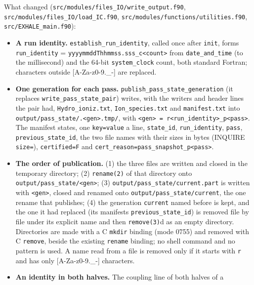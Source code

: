 \documentclass[english,a4paper]{my_memo}
\providecommand{\tightlist}{\setlength{\itemsep}{0pt}\setlength{\parskip}{0pt}}
\begin{document}
What changed (\texttt{src/modules/files\_IO/write\_output.f90},
\texttt{src/modules/files\_IO/load\_IC.f90}, \texttt{src/modules/functions/utilities.f90},
\texttt{src/EXHALE\_main.f90}):

\begin{itemize}
\tightlist
\item
  \textbf{A run identity.} \texttt{establish\_run\_identity}, called once after \texttt{init},
  forms \texttt{run\_identity} = \texttt{yyyymmddThhmmss.sss\_c\textless{}count\textgreater{}} from
  \texttt{date\_and\_time} (to the millisecond) and the 64-bit \texttt{system\_clock} count,
  both standard Fortran; characters outside {[}A-Za-z0-9.\_-{]} are replaced.
\item
  \textbf{One generation for each pass.} \texttt{publish\_pass\_state\_generation}
  (it replaces \texttt{write\_pass\_state\_pair}) writes, with the writers and header
  lines the pair had, \texttt{Hydro\_ioniz.txt}, \texttt{Ion\_species.txt} and
  \texttt{manifest.txt} into \texttt{output/pass\_state/.\textless{}gen\textgreater{}.tmp/}, with
  \texttt{\textless{}gen\textgreater{}\ =\ r\textless{}run\_identity\textgreater{}\_p\textless{}pass\textgreater{}}. The manifest states, one \texttt{key=value} a
  line, \texttt{state\_id}, \texttt{run\_identity}, \texttt{pass}, \texttt{previous\_state\_id}, the two file
  names with their sizes in bytes (INQUIRE \texttt{size=}), \texttt{certified=F} and
  \texttt{cert\_reason=pass\_snapshot\_p\textless{}pass\textgreater{}}.
\item
  \textbf{The order of publication.} (1) the three files are written and closed
  in the temporary directory; (2) \texttt{rename(2)} of that directory onto
  \texttt{output/pass\_state/\textless{}gen\textgreater{}}; (3) \texttt{output/pass\_state/current.part} is written
  with \texttt{\textless{}gen\textgreater{}}, closed and renamed onto \texttt{output/pass\_state/current}, the one
  rename that publishes; (4) the generation \texttt{current} named before is kept,
  and the one it had replaced (its manifest\textquotesingle s \texttt{previous\_state\_id}) is removed
  file by file under its explicit name and then \texttt{remove(3)}d as an empty
  directory. Directories are made with a C \texttt{mkdir} binding (mode 0755) and
  removed with C \texttt{remove}, beside the existing \texttt{rename} binding; no shell
  command and no pattern is used. A name read from a file is removed only if
  it starts with \texttt{r} and has only {[}A-Za-z0-9.\_-{]} characters.
\item
  \textbf{An identity in both halves.} The coupling line of both halves of a

\end{itemize}
\end{document}
